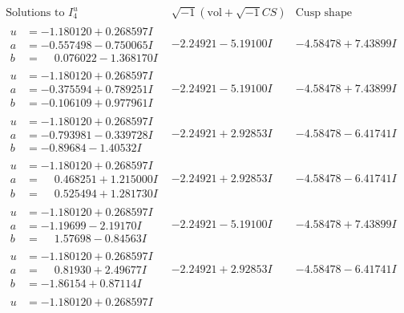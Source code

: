\documentclass[1p]{elsarticle_modified}
\theoremstyle{definition}
\newcommand{\I}{\sqrt{-1}}
\begin{document}
$$\begin{array}{c|c|c}  
\text{Solutions to }I^u_{4}& \I (\text{vol} + \sqrt{-1}CS) & \text{Cusp shape}\\
 \hline 
\begin{aligned}
u &= -1.180120 + 0.268597 I \\
a &= -0.557498 - 0.750065 I \\
b &= \phantom{-}0.076022 - 1.368170 I\end{aligned}
 & -2.24921 - 5.19100 I & -4.58478 + 7.43899 I \\ \hline\begin{aligned}
u &= -1.180120 + 0.268597 I \\
a &= -0.375594 + 0.789251 I \\
b &= -0.106109 + 0.977961 I\end{aligned}
 & -2.24921 - 5.19100 I & -4.58478 + 7.43899 I \\ \hline\begin{aligned}
u &= -1.180120 + 0.268597 I \\
a &= -0.793981 - 0.339728 I \\
b &= -0.89684 - 1.40532 I\end{aligned}
 & -2.24921 + 2.92853 I & -4.58478 - 6.41741 I \\ \hline\begin{aligned}
u &= -1.180120 + 0.268597 I \\
a &= \phantom{-}0.468251 + 1.215000 I \\
b &= \phantom{-}0.525494 + 1.281730 I\end{aligned}
 & -2.24921 + 2.92853 I & -4.58478 - 6.41741 I \\ \hline\begin{aligned}
u &= -1.180120 + 0.268597 I \\
a &= -1.19699 - 2.19170 I \\
b &= \phantom{-}1.57698 - 0.84563 I\end{aligned}
 & -2.24921 - 5.19100 I & -4.58478 + 7.43899 I \\ \hline\begin{aligned}
u &= -1.180120 + 0.268597 I \\
a &= \phantom{-}0.81930 + 2.49677 I \\
b &= -1.86154 + 0.87114 I\end{aligned}
 & -2.24921 + 2.92853 I & -4.58478 - 6.41741 I \\ \hline\begin{aligned}
u &= -1.180120 + 0.268597 I \\

\end{aligned}
\end{array}$$
\end{document}
